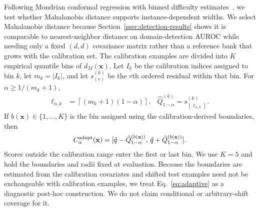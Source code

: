 Following Mondrian conformal regression with binned difficulty estimates~\cite{Bostrom2020Mondrian}, we test whether Mahalanobis distance supports instance-dependent widths. We select Mahalanobis distance because Section~\ref{ssec:detection-results} shows it is comparable to nearest-neighbor distance on domain-detection AUROC while needing only a fixed $(d,d)$ covariance matrix rather than a reference bank that grows with the calibration set. The calibration examples are divided into $K$ empirical quantile bins of $d_M(\mathbf{x})$. Let $I_k$ be the calibration indices assigned to bin $k$, let $m_k=|I_k|$, and let $s_{(r)}^{(k)}$ be the $r$th ordered residual within that bin. For $\alpha\geq1/(m_k+1)$,
\begin{align}
    \ell_{\alpha,k}
    &= \left\lceil(m_k+1)(1-\alpha)\right\rceil, %
    &\hat Q_{1-\alpha}^{(k)}=s_{(\ell_{\alpha,k})}^{(k)}.
    \label{eq:bin-quantile}
\end{align} 
If $b(\mathbf{x})\in\{1,\ldots,K\}$ is the bin assigned using the calibration-derived boundaries, then
\begin{align}
    C_{\alpha}^{\mathrm{adapt}}(\mathbf{x})
    =
    [\hat{q}-\hat Q_{1-\alpha}^{(b(\mathbf{x}))},\,
     \hat{q}+\hat Q_{1-\alpha}^{(b(\mathbf{x}))}].
    \label{eq:adaptive}
\end{align}
Scores outside the calibration range enter the first or last bin. We use $K=5$ and hold the boundaries and radii fixed at evaluation. Because the boundaries are estimated from the calibration covariates and shifted test examples need not be exchangeable with calibration examples, we treat Eq.~\eqref{eq:adaptive} as a diagnostic post-hoc construction. We do not claim conditional or arbitrary-shift coverage for it.
